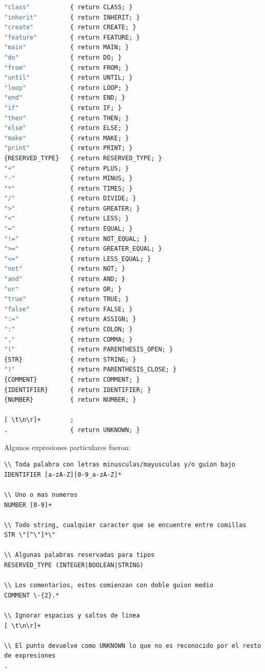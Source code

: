 \documentclass[a4paper,12pt]{article}
\begin{document}
\begin{lstlisting}[language=Eiffel, style=myeiffel]
"class"           { return CLASS; }
"inherit"         { return INHERIT; }
"create"          { return CREATE; }
"feature"         { return FEATURE; }
"main"            { return MAIN; }
"do"              { return DO; }
"from"            { return FROM; }
"until"           { return UNTIL; }
"loop"            { return LOOP; }
"end"             { return END; }
"if"              { return IF; }
"then"            { return THEN; }
"else"            { return ELSE; }
"make"            { return MAKE; }
"print"           { return PRINT; }
{RESERVED_TYPE}   { return RESERVED_TYPE; }
"+"               { return PLUS; }
"-"               { return MINUS; }
"*"               { return TIMES; }
"/"               { return DIVIDE; }
">"               { return GREATER; }
"<"               { return LESS; }
"="               { return EQUAL; }
"!="              { return NOT_EQUAL; }
">="              { return GREATER_EQUAL; }
"<="              { return LESS_EQUAL; }
"not"             { return NOT; }
"and"             { return AND; }
"or"              { return OR; }
"true"            { return TRUE; }
"false"           { return FALSE; }
":="              { return ASSIGN; }
":"               { return COLON; }
","               { return COMMA; }
"("               { return PARENTHESIS_OPEN; }
{STR}             { return STRING; }
")"               { return PARENTHESIS_CLOSE; }
{COMMENT}         { return COMMENT; }
{IDENTIFIER}      { return IDENTIFIER; }
{NUMBER}          { return NUMBER; }

[ \t\n\r]+        ;
.                 { return UNKNOWN; }
\end{lstlisting}

\newpage

\noindent
Algunos expresiones particulares fueron:

\begin{lstlisting}[style=myeiffel]
\\ Toda palabra con letras minusculas/mayusculas y/o guion bajo
IDENTIFIER [a-zA-Z][0-9_a-zA-Z]*  

\\ Uno o mas numeros
NUMBER [0-9]+

\\ Todo string, cualquier caracter que se encuentre entre comillas
STR \"[^\"]*\"

\\ Algunas palabras reservadas para tipos
RESERVED_TYPE (INTEGER|BOOLEAN|STRING)

\\ Los comentarios, estos comienzan con doble guion medio
COMMENT \-{2}.*

\\ Ignorar espacios y saltos de linea
[ \t\n\r]+ 

\\ El punto devuelve como UNKNOWN lo que no es reconocido por el resto de expresiones
.
\end{lstlisting}
\end{document}
